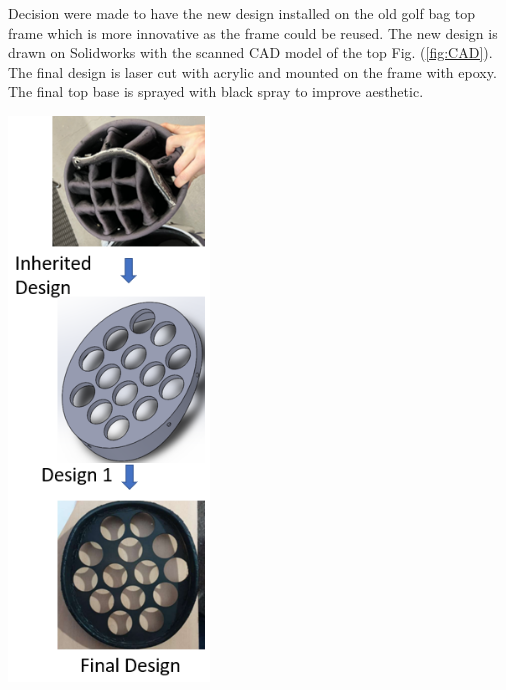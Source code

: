 \documentclass[11pt,landscape]{article}
\newenvironment{Figure}
  {\par\medskip\noindent\minipage{\linewidth}}
  {\endminipage\par\medskip}
\begin{document}
\begin{multicols}{3}
    Decision were made to have the new design installed on the old golf bag
    top frame which is more innovative as the frame could be reused. The new
    design is drawn on Solidworks with the scanned CAD model of the top
     Fig. (\ref{fig:CAD}). The final design is laser cut with acrylic and
    mounted on the frame with epoxy. The final top base is sprayed with black
    spray to improve aesthetic.
    \begin{Figure}
        \begin{center}
            \includegraphics[width=0.4\textwidth]{Figure.png}
            \label{fig:change}
        \end{center}
    \end{Figure}
    

\end{multicols}
\end{document}
